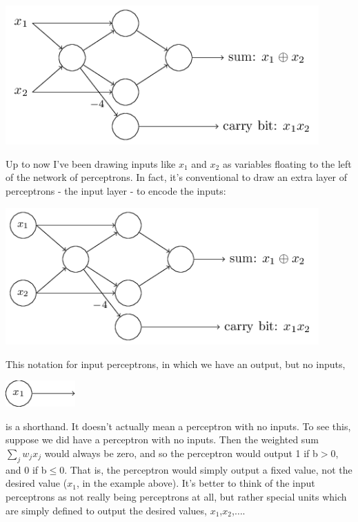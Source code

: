 {\centering
\includegraphics[width=0.9\textwidth,]{pic/perceptronadder02}
\par}

Up to now I've been drawing inputs like $x_1$ and $x_2$ as variables floating to the left of the network of perceptrons. In fact, it's conventional to draw an extra layer of perceptrons - the input layer - to encode the inputs: 


{\centering
\includegraphics[width=0.9\textwidth,]{pic/perceptronadder03}
\par}

This notation for input perceptrons, in which we have an output, but no inputs, 

{\centering
\includegraphics[width=0.2\textwidth,]{pic/inputnode}
\par}

is a shorthand. It doesn't actually mean a perceptron with no inputs. To see this, suppose we did have a perceptron with no inputs. Then the weighted sum $\sum_{j} w_{j} x_{j}$ would always be zero, and so the perceptron would output 1 if b$>$0, and 0 if b$\leq$0. That is, the perceptron would simply output a fixed value, not the desired value ($x_1$, in the example above). It's better to think of the input perceptrons as not really being perceptrons at all, but rather special units which are simply defined to output the desired values, $x_1$,$x_2$,$\ldots$.


